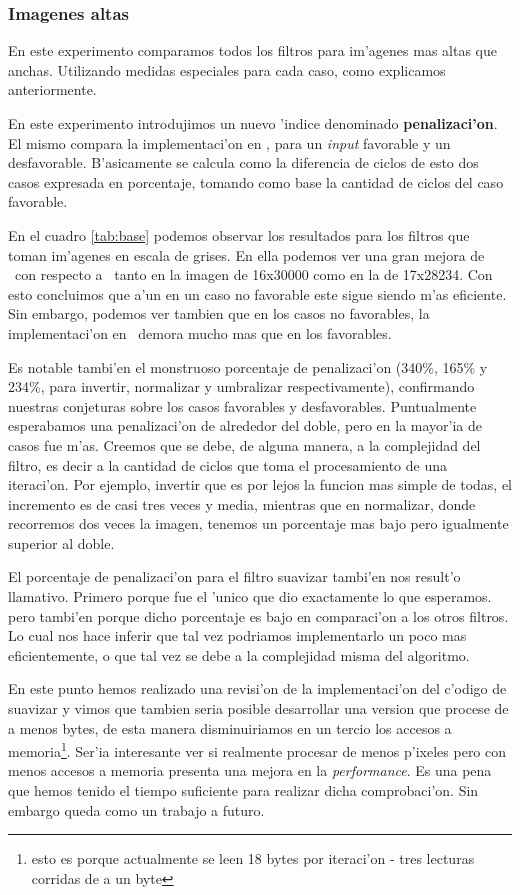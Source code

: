 \subsubsection{Imagenes altas}
En este experimento comparamos todos los filtros para im'agenes mas altas que anchas. Utilizando medidas especiales para cada caso, como explicamos anteriormente. 

En este experimento introdujimos un nuevo 'indice denominado \textbf{penalizaci'on}. El mismo compara la implementaci'on en \ass, para un \textit{input} favorable y un desfavorable. B'asicamente se calcula como la diferencia de ciclos de esto dos casos expresada en porcentaje, tomando como base la cantidad de ciclos del caso favorable.

En el cuadro \ref{tab:base} podemos observar los resultados para los filtros que toman im'agenes en escala de grises. En ella podemos ver una 
gran mejora de \ass \ con respecto a \C \  tanto en la imagen de 16x30000 como en la de 17x28234. Con esto concluimos que a'un
en un caso no favorable este sigue siendo m'as eficiente. Sin embargo, podemos ver tambien que en los casos no favorables, la implementaci'on en \ass\ demora mucho mas que en los favorables. 

Es notable tambi'en el monstruoso porcentaje de penalizaci'on (340\%, 165\% y
234\%, para invertir, normalizar y umbralizar respectivamente), confirmando nuestras conjeturas sobre los casos favorables y desfavorables. Puntualmente esperabamos una penalizaci'on de alrededor del doble, pero en la mayor'ia de casos fue m'as. Creemos que se debe, de alguna manera, a la complejidad del filtro, es decir a la cantidad de ciclos que toma el procesamiento de una iteraci'on. Por ejemplo, invertir que es por lejos la funcion mas simple de todas, el incremento es de casi tres veces y media, mientras que en normalizar, donde recorremos dos veces la imagen, tenemos un porcentaje mas bajo pero igualmente superior al doble. 

El porcentaje de penalizaci'on para el filtro suavizar tambi'en nos result'o llamativo. Primero porque fue el 'unico que dio exactamente lo que esperamos. pero tambi'en porque dicho porcentaje es bajo en comparaci'on a los otros filtros. Lo cual nos hace inferir que tal vez podriamos implementarlo un poco mas eficientemente, o que tal vez se debe a la complejidad misma del algoritmo. 

En este punto hemos realizado una revisi'on de la implementaci'on del c'odigo de suavizar y vimos que tambien seria posible desarrollar una version que procese de a menos bytes, de esta manera disminuiriamos en un tercio los accesos a memoria\footnote{esto es porque actualmente se leen 18 bytes por iteraci'on - tres lecturas corridas de a un byte}. Ser'ia interesante ver si realmente procesar de menos p'ixeles pero con menos accesos a memoria presenta una mejora en la \textit{performance}. Es una pena que hemos tenido el tiempo suficiente para realizar dicha comprobaci'on. Sin embargo queda como un trabajo a futuro.

